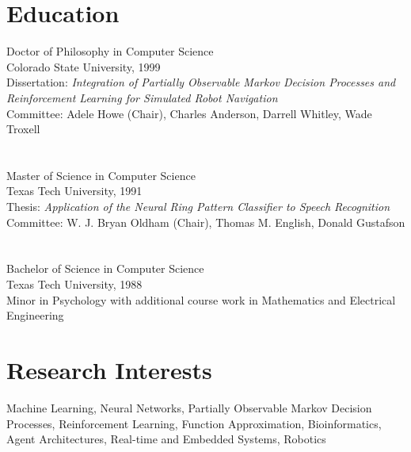 \documentclass[12pt,letter]{resume}
\makeatletter
\newcommand\myaddress{13286 Edgewood Place\\Piedmont, SD 57769 \\
         ldpyeatt@gmail.com \\ (806)241-6151}
\renewcommand\myaddress{Department of Computer Science and Electrical Engineering\\
  South Dakota School of Mines and Technology\\
         larry.pyeatt@sdsmt.edu}
\makeatother
\begin{document}

\pagestyle{fancyplain}
\thispagestyle{empty}

\address{\myaddress}
\line

\section{Education}
  {Doctor of Philosophy in Computer Science}
  {\\Colorado State University, 1999 \\
  Dissertation:  {\it Integration of Partially Observable Markov
Decision Processes and Reinforcement Learning for Simulated Robot 
Navigation}\\ 
  Committee: Adele Howe (Chair), Charles Anderson, 
  Darrell Whitley, Wade Troxell }
   
\section{} 
  {Master of Science in Computer Science}    
  {\\Texas Tech University, 1991 \\
  Thesis:   {\it Application of the Neural Ring Pattern Classifier
  to Speech Recognition}\\
  Committee: W. J. Bryan Oldham (Chair), Thomas M. English, Donald Gustafson}
   
\section{} 
  {Bachelor of Science in Computer Science}    
  {\\Texas Tech University, 1988 \\
  Minor in Psychology with additional course work in Mathematics and 
  Electrical Engineering}

\section{Research Interests}  
  {} {Machine Learning, Neural Networks, Partially Observable Markov
    Decision Processes, Reinforcement Learning, Function
    Approximation, Bioinformatics, Agent Architectures, Real-time and
    Embedded Systems, Robotics }
\end{document}

